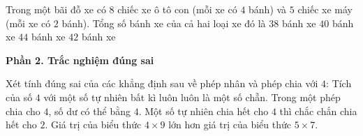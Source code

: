 \begin{ex} %
Trong một bãi đỗ xe có $8$ chiếc xe ô tô con (mỗi xe có $4$ bánh) và $5$ chiếc xe máy (mỗi xe có $2$ bánh). Tổng số bánh xe của cả hai loại xe đó là
\choice
{$38$ bánh xe}
{$40$ bánh xe}
{$44$ bánh xe}
{\True $42$ bánh xe}
\end{ex}

\textbf{Phần 2. Trắc nghiệm đúng sai}

\begin{ex} %
Xét tính đúng sai của các khẳng định sau về phép nhân và phép chia với $4$:
\choiceTF
{\True Tích của số $4$ với một số tự nhiên bất kì luôn luôn là một số chẵn.}
{Trong một phép chia cho $4$, số dư có thể bằng $4$.}
{\True Một số tự nhiên chia hết cho $4$ thì chắc chắn chia hết cho $2$.}
{\True Giá trị của biểu thức $4 \times 9$ lớn hơn giá trị của biểu thức $5 \times 7$.}
\end{ex}

